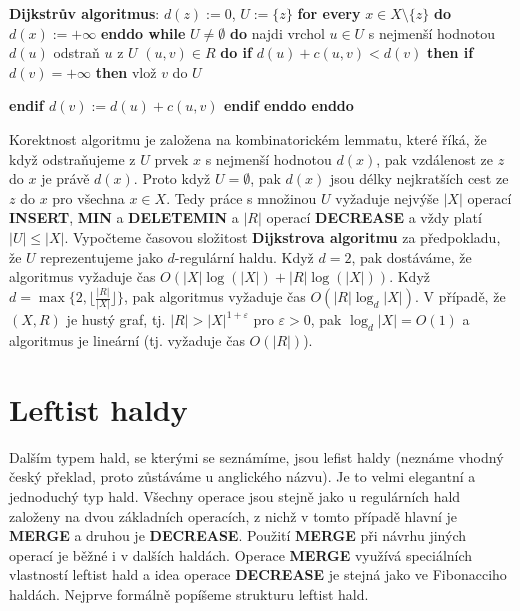 \documentclass[a4paper,12pt]{article}
\begin{document}
{\bf Dijkstrův algoritmus}:\newline 
$d(z):=0$, $U:=\{z\}$\newline 
{\bf for every} $x\in X\setminus \{z\}$ {\bf do} $d(x):=+\infty$ {\bf enddo\newline 
while} $U\ne\emptyset$ {\bf do\newline 
\phantom{{\rm ---}}}najdi vrchol $u\in U$ s nejmenší hodnotou $
d(u)$\newline 
\phantom{---}odstraň $u$ z $U$\newline 
\phantom{---}{\bf for every} $(u,v)\in R$ {\bf do \newline 
\phantom{{\rm ------}}if} $d(u)+c(u,v)<d(v)$ {\bf then\newline 
\phantom{{\rm ---------}}if} $d(v)=+\infty$ {\bf then} vlož $v$ do $
U$ {\bf endif\newline 
\phantom{{\rm ---------}}$d(v):=d(u)+c(u,v)$\newline 
\phantom{{\rm ------}}endif\newline 
\phantom{{\rm ---}}enddo\newline 
enddo

}
Korektnost algoritmu je založena na kombinatorickém 
lemmatu, které říká, že když odstra\-ňuje\-me z $
U$ prvek $x$ s 
nejmenší hodnotou $d(x)$, pak vzdálenost ze $z$ do $x$ je právě 
$d(x)$. Proto když $U=\emptyset$, pak $d(x)$ jsou délky nejkratších cest ze 
$z$ do $x$ pro všechna $x\in X$. Tedy práce s množinou $U$ vyžaduje 
nejvýše $|X|$ operací {\bf INSERT}, {\bf MIN} a {\bf DELETEMIN} a $
|R|$ operací 
{\bf DECREASE} a vždy platí $|U|\le |X|$. Vypočteme časovou složitost 
{\bf Dijkstrova algoritmu} za předpokladu, že $U$ reprezentujeme jako $
d$-regulární 
haldu. Když $d=2$, pak dostáváme, že algoritmus vyžaduje čas 
$O(|X|\log(|X|)+|R|\log(|X|))$. Když $d=\max\{2,\lfloor\frac {
|R|}{|X|}\rfloor \}$, pak algoritmus 
vyžaduje čas $O(|R|\log_d|X|)$. V případě, že $
(X,R)$ je hustý graf, 
tj. $|R|>|X|^{1+\varepsilon}$ pro $\varepsilon >0$, pak $\log_d|X
|=O(1)$ a algoritmus 
je lineární (tj. vyžaduje čas $O(|R|)$).

 
\section{{Leftist haldy}}

Dalším typem hald, se kterými se seznámíme, jsou lefist 
haldy (neznáme vhodný český překlad, proto zůstáváme 
u anglického názvu). Je to velmi elegantní a jednoduchý typ 
hald. Všechny operace jsou stejně jako u regulárních hald 
založeny na 
dvou základních operacích, z nichž v tomto případě hlavní je {\bf MERGE} a  
druhou je {\bf DECREASE}. Použití {\bf MERGE }
při návrhu jiných operací je běžné i v dalších haldách. 
Operace {\bf MERGE} využívá speciálních vlastností leftist 
hald a idea operace {\bf DECREASE} je stejná jako ve 
Fibonacciho haldách. Nejprve formálně popíšeme strukturu 
leftist hald. 
\end{document}
